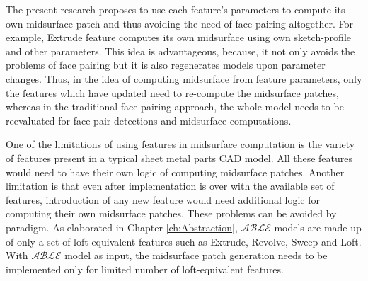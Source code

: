 %
%	
%
%
 The present research proposes to use each feature's parameters to compute its own midsurface patch and thus avoiding the need of face pairing altogether. For example, Extrude feature computes its own midsurface using own sketch-profile and other parameters. This idea is advantageous, because, it not only avoids the problems of face pairing but it is also regenerates models upon parameter changes. Thus, in the idea of computing midsurface from feature parameters, only the features which have updated need to re-compute the midsurface patches, whereas in the traditional face pairing approach, the whole model needs to be reevaluated for face pair detections and midsurface computations.

One of the limitations of using features in midsurface computation is the variety of features present in a typical sheet metal parts CAD model. All these features would need to have their own logic of computing midsurface patches.  Another limitation is that even after implementation is over with the available set of features, introduction of any new feature would need additional logic for computing their own midsurface patches. These problems can be avoided by  paradigm. As elaborated in Chapter \ref{ch:Abstraction}, $\mathcal{ABLE}$ models are made up of only a set of loft-equivalent features such as Extrude, Revolve, Sweep and Loft. With $\mathcal{ABLE}$ model as input, the midsurface patch generation needs to be implemented only for limited number of  loft-equivalent features.

